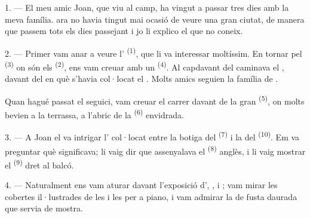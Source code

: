 %

\VUsaut{4.0mm}
\VUsaut{3.0mm}

\VUsaut{3.0mm}

1. --- El meu amic Joan, que viu al camp, ha vingut a passar tres dies amb la meva família.
 ara no havia tingut mai ocasió de veure una gran ciutat, de manera que passem
tots els dies passejant i jo li explico el que no coneix.

2. --- Primer vam anar a veure l' \textsuperscript{(1)}, que li va
interessar moltíssim. En tornar pel  \textsuperscript{(3)} on són els
 \textsuperscript{(2)}, ens vam creuar amb un
 \textsuperscript{(4)}. Al capdavant del  caminava el , davant del  en què s'havia
col·locat el . Molts amics seguien la família de
.

Quan hagué passat el seguici, vam creuar el carrer davant de la gran
 \textsuperscript{(5)}, on molts  bevien
 a la terrassa, a l'abric de la 
\textsuperscript{(6)} envidrada.

3. --- A Joan el va intrigar l' col·locat entre la botiga del
 \textsuperscript{(7)} i la del
 \textsuperscript{(10)}. Em va preguntar què significava;
li vaig dir que assenyalava el  \textsuperscript{(8)} anglès, i li vaig
mostrar el  \textsuperscript{(9)} dret al balcó.

\VUsaut{3.0mm}

4. --- Naturalment ens vam aturar davant l'exposició d',
,  i ; vam mirar les cobertes il·lustrades de
les  i les  per a piano, i vam admirar la  de
fusta daurada que servia de mostra.

